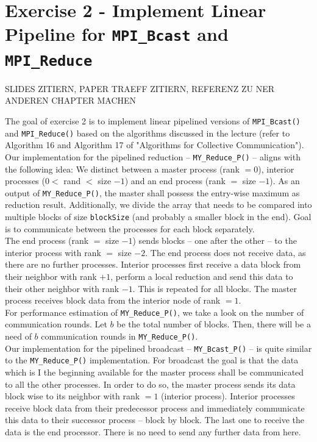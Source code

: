 \section{Exercise 2 - Implement Linear Pipeline for \texttt{MPI\_Bcast} and \texttt{MPI\_Reduce}}

SLIDES ZITIERN, PAPER TRAEFF ZITIERN, REFERENZ ZU NER ANDEREN CHAPTER MACHEN

The goal of exercise 2 is to implement linear pipelined versions of \texttt{MPI\_Bcast()} and \texttt{MPI\_Reduce()} 
based on the algorithms discussed in the lecture (refer to Algorithm 16 and Algorithm 17 of "Algorithms for Collective 
Communication"). \\

Our implementation for the pipelined reduction -- \texttt{MY\_Reduce\_P()} – aligns with the following idea: We 
distinct between a master process (rank $= 0$), interior processes ($0 <$ rand $<$ size $-1$) and an end process 
(rank $=$ size $-1$). As an output of \texttt{MY\_Reduce\_P()}, the master shall possess the entry-wise maximum as 
reduction result. Additionally, we divide the array that needs to be compared into multiple blocks of size 
\texttt{blockSize} (and probably a smaller block in the end). Goal is to communicate between the processes for each 
block separately. \\

The end process (rank $=$ size $-1$) sends blocks – one after the other -- to the interior process with 
rank $=$ size $-2$. The end process does not receive data, as there are no further processes. Interior processes 
first receive a data block from their neighbor with rank $+1$, perform a local reduction and send this data to their 
other neighbor with rank $-1$. This is repeated for all blocks. The master process receives block data from the interior 
node of rank $=1$.\\

For performance estimation of \texttt{MY\_Reduce\_P()}, we take a look on the number of communication rounds. Let $b$ 
be the total number of blocks. Then, there will be a need of $b$ communication rounds in \texttt{MY\_Reduce\_P()}. \\

Our implementation for the pipelined broadcast -- \texttt{MY\_Bcast\_P()} – is quite similar to the 
\texttt{MY\_Reduce\_P()} implementation. For broadcast the goal is that the data which is I the beginning 
available for the master process shall be communicated to all the other processes. In order to do so, the master 
process sends its data block wise to its neighbor with rank $=1$ (interior process). Interior processes receive block 
data from their predecessor process and immediately communicate this data to their successor process – block by 
block. The last one to receive the data is the end processor. There is no need to send any further data from here.\\

